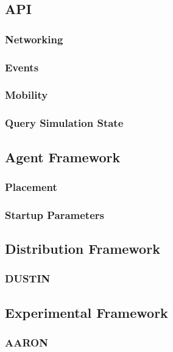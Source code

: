 \subsection{API}
\subsubsection{Networking}
\subsubsection{Events}
\subsubsection{Mobility}
\subsubsection{Query Simulation State}

\subsection{Agent Framework}
\subsubsection{Placement}
\subsubsection{Startup Parameters}

\subsection{Distribution Framework}
\subsubsection{DUSTIN}

\subsection{Experimental Framework}
\subsubsection{AARON}
